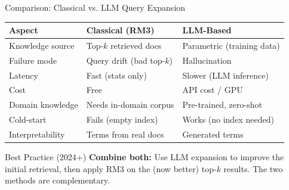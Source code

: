 \documentclass[aspectratio=169]{beamer}
\begin{document}
\begin{frame}{Comparison: Classical vs. LLM Query Expansion}
\begin{table}
\centering
\small
\begin{tabular}{lll}
\toprule
\textbf{Aspect} & \textbf{Classical (RM3)} & \textbf{LLM-Based} \\
\midrule
Knowledge source & Top-$k$ retrieved docs & Parametric (training data) \\
Failure mode & Query drift (bad top-$k$) & Hallucination \\
Latency & Fast (stats only) & Slower (LLM inference) \\
Cost & Free & API cost / GPU \\
Domain knowledge & Needs in-domain corpus & Pre-trained, zero-shot \\
Cold-start & Fails (empty index) & Works (no index needed) \\
Interpretability & Terms from real docs & Generated terms \\
\bottomrule
\end{tabular}
\end{table}

\vspace{1em}

\begin{exampleblock}{Best Practice (2024+)}
\textbf{Combine both:} Use LLM expansion to improve the initial retrieval, then apply RM3 on the (now better) top-$k$ results. The two methods are complementary.
\end{exampleblock}
\end{frame}
\end{document}
